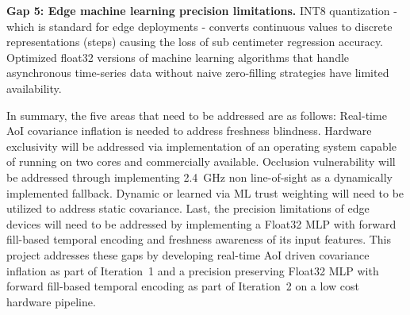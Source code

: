 \textbf{Gap 5: Edge machine learning precision limitations.} INT8 quantization - which is standard for edge deployments - converts continuous values to discrete representations (steps) causing the loss of sub centimeter regression accuracy. Optimized float32 versions of machine learning algorithms that handle asynchronous time-series data without naive zero-filling strategies have limited availability.

In summary, the five areas that need to be addressed are as follows: Real-time AoI covariance inflation is needed to address freshness blindness. Hardware exclusivity will be addressed via implementation of an operating system capable of running on two cores and commercially available. Occlusion vulnerability will be addressed through implementing 2.4~GHz non line-of-sight as a dynamically implemented fallback. Dynamic or learned via ML trust weighting will need to be utilized to address static covariance. Last, the precision limitations of edge devices will need to be addressed by implementing a Float32 MLP with forward fill-based temporal encoding and freshness awareness of its input features. This project addresses these gaps by developing real-time AoI driven covariance inflation as part of Iteration~1 and a precision preserving Float32 MLP with forward fill-based temporal encoding as part of Iteration~2 on a low cost hardware pipeline.
